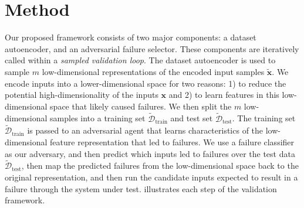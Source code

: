 \section{Method}
Our proposed framework consists of two major components: a dataset autoencoder, and an adversarial failure selector. These components are iteratively called within a \textit{sampled validation loop}. The dataset autoencoder is used to sample $m$ low-dimensional representations of the encoded input samples $\tilde{\mathbf{x}}$. We encode inputs into a lower-dimensional space for two reasons: 1) to reduce the potential high-dimensionality of the inputs $\mathbf{x}$ and 2) to learn features in this low-dimensional space that likely caused failures.
We then split the $m$ low-dimensional samples into a training set $\tilde{\mathcal{D}}_\text{train}$ and test set $\tilde{\mathcal{D}}_\text{test}$.
The training set $\tilde{\mathcal{D}}_\text{train}$ is passed to an adversarial agent that learns characteristics of the low-dimensional feature representation that led to failures.
We use a failure classifier as our adversary, and then predict which inputs led to failures over the test data $\tilde{\mathcal{D}}_\text{test}$, then map the predicted failures from the low-dimensional space back to the original representation, and then run the candidate inputs expected to result in a failure through the system under test.  illustrates each step of the validation framework.


